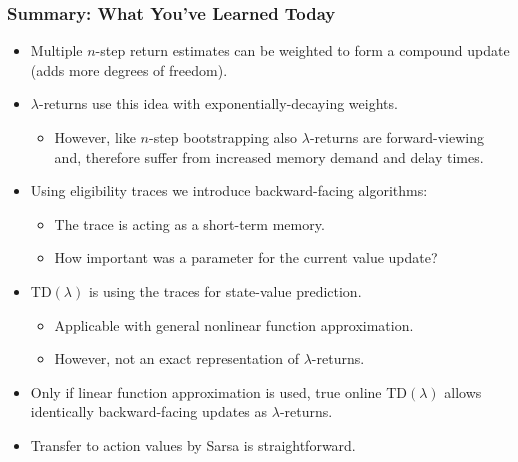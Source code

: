 \begin{frame}
\frametitle{Summary: What You've Learned Today}
\begin{itemize}
	\item Multiple $n$-step return estimates can be weighted to form a compound update (adds more degrees of freedom).\pause
	\item $\lambda$-returns use this idea with exponentially-decaying weights.
	\begin{itemize}
		\item However, like $n$-step bootstrapping also $\lambda$-returns are forward-viewing and, therefore suffer from increased memory demand and delay times.
	\end{itemize}\pause
	\item Using eligibility traces we introduce backward-facing algorithms:
		\begin{itemize}
			\item The trace is acting as a short-term memory.
			\item How important was a parameter for the current value update? 
		\end{itemize}\pause
	\item TD$(\lambda)$	is using the traces for state-value prediction.
	\begin{itemize}
		\item Applicable with general nonlinear function approximation.
		\item However, not an exact representation of $\lambda$-returns.
	\end{itemize}\pause
	\item Only if linear function approximation is used, true online TD$(\lambda)$ allows identically backward-facing updates as $\lambda$-returns. \pause
	\item Transfer to action values by Sarsa is straightforward.
\end{itemize}
\end{frame}